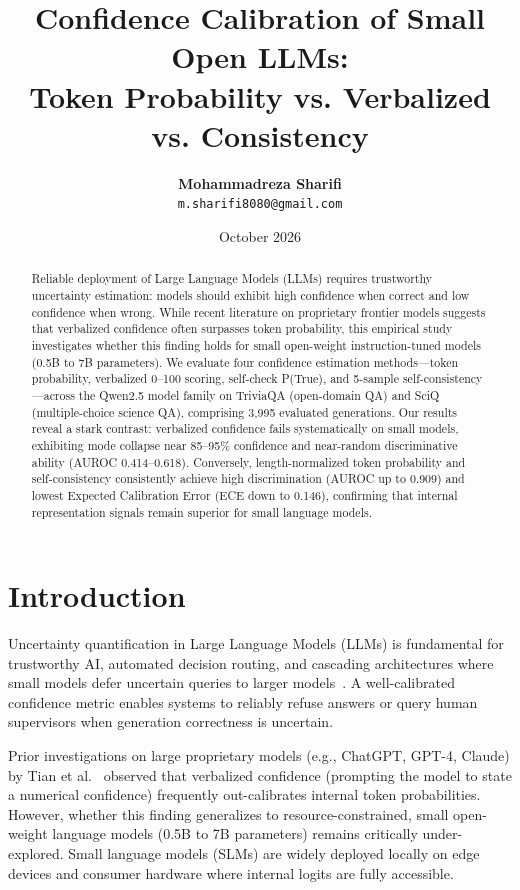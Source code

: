 \documentclass[10pt,twocolumn]{article}
\title{\textbf{Confidence Calibration of Small Open LLMs:\\Token Probability vs. Verbalized vs. Consistency}}
\author{
  \textbf{Mohammadreza Sharifi}\\
  \texttt{m.sharifi8080@gmail.com}
}
\date{October 2026}
\begin{document}
\maketitle

\begin{abstract}
Reliable deployment of Large Language Models (LLMs) requires trustworthy uncertainty estimation: models should exhibit high confidence when correct and low confidence when wrong. While recent literature on proprietary frontier models suggests that verbalized confidence often surpasses token probability, this empirical study investigates whether this finding holds for small open-weight instruction-tuned models (0.5B to 7B parameters). We evaluate four confidence estimation methods---token probability, verbalized 0--100 scoring, self-check P(True), and 5-sample self-consistency---across the Qwen2.5 model family on TriviaQA (open-domain QA) and SciQ (multiple-choice science QA), comprising 3,995 evaluated generations. Our results reveal a stark contrast: verbalized confidence fails systematically on small models, exhibiting mode collapse near 85--95\% confidence and near-random discriminative ability (AUROC 0.414--0.618). Conversely, length-normalized token probability and self-consistency consistently achieve high discrimination (AUROC up to 0.909) and lowest Expected Calibration Error (ECE down to 0.146), confirming that internal representation signals remain superior for small language models.
\end{abstract}

\section{Introduction}
Uncertainty quantification in Large Language Models (LLMs) is fundamental for trustworthy AI, automated decision routing, and cascading architectures where small models defer uncertain queries to larger models~\cite{zhang2026confidence}. A well-calibrated confidence metric enables systems to reliably refuse answers or query human supervisors when generation correctness is uncertain.

Prior investigations on large proprietary models (e.g., ChatGPT, GPT-4, Claude) by Tian et al.~\cite{tian2023just} observed that verbalized confidence (prompting the model to state a numerical confidence) frequently out-calibrates internal token probabilities. However, whether this finding generalizes to resource-constrained, small open-weight language models (0.5B to 7B parameters) remains critically under-explored. Small language models (SLMs) are widely deployed locally on edge devices and consumer hardware where internal logits are fully accessible.
\end{document}
